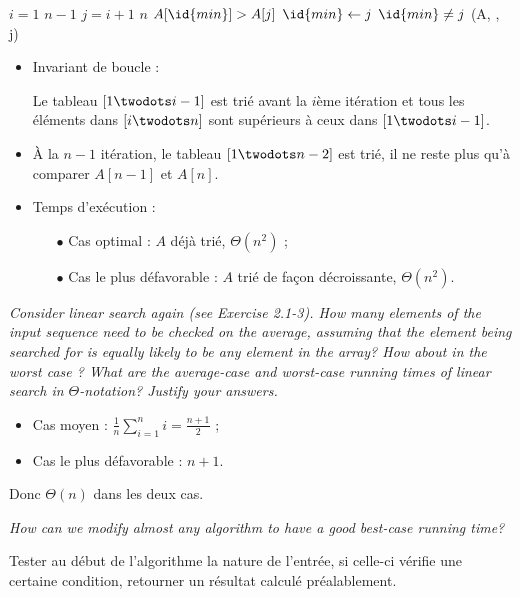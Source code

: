 \begin{description}
  \begin{ex}
    \begin{codebox}
       \li \For $i = 1$ \To $n-1$ \Do
       \li {}
       \li \For $j = i+1$ \To $n$ \Do
       \li \If $A[\id{min}] > A[j]$ \Then
       \li $\id{min} \gets j$ \End \End
       \li \If $\id{min} \ne j$ \Then
       \li {}(A, , j) \End \End%
    \end{codebox}

    \begin{itemize}
      \item Invariant de boucle : 

        Le tableau $[1 \twodots i-1]$ est tri\'e avant la $i$\`eme it\'eration et tous les \'el\'ements dans $[i \twodots n]$ sont sup\'erieurs \`a ceux dans $[1\twodots i-1]$.

      \item \`A la $n-1$ it\'eration, le tableau $[1\twodots n-2]$ est tri\'e, il ne reste plus qu'\`a comparer $A[n-1]$ et $A[n]$.

     \item Temps d'ex\'ecution :
        \begin{itemize}
          \item[$\bullet$] Cas optimal : $A$ d\'ej\`a tri\'e, $\Theta(n^2)$ ;
          \item[$\bullet$] Cas le plus d\'efavorable : $A$ tri\'e de fa\c{c}on d\'ecroissante, $\Theta(n^2)$.
        \end{itemize}

    \end{itemize}

  \end{ex}

 {\itshape Consider linear search again (see Exercise 2.1-3). How many elements of the input sequence need to be checked on the average, assuming that the element being searched for is equally likely to be any element in the array? How about in the worst case ? What are the average-case and worst-case running times of linear search in $\Theta$-notation? Justify your answers.}

  \begin{ex}
    \begin{itemize}
      \item Cas moyen : $\frac{1}{n}\sum_{i=1}^ni = \frac{n+1}{2}$ ;
      \item Cas le plus d\'efavorable : $n+1$.
    \end{itemize}
    Donc $\Theta(n)$ dans les deux cas.
  \end{ex}

 {\itshape How can we modify almost any algorithm to have a good best-case running time?}

  \begin{ex}
    Tester au d\'ebut de l'algorithme la nature de l'entr\'ee, si celle-ci v\'erifie une certaine condition, retourner un r\'esultat calcul\'e pr\'ealablement. 
  \end{ex}

\end{description}

